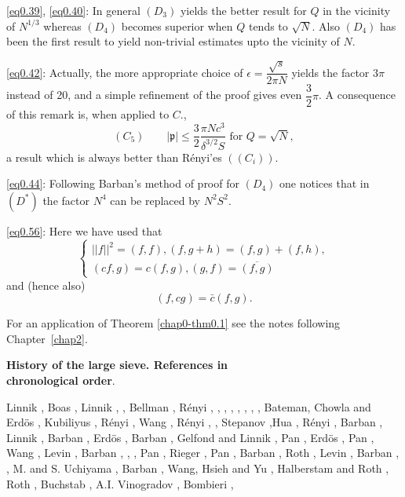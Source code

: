 \eqref{eq0.39}, \eqref{eq0.40}: In general $(D_3)$ yields the better
result for $Q$ in the vicinity of $N^{1/3}$ whereas $(D_4)$ becomes
superior when $Q$ tends to $\sqrt{N}$. Also $(D_4)$ has been the first
result to yield non-trivial estimates upto the vicinity of $N$. 
  
\eqref{eq0.42}: Actually, the more appropriate choice of
$\epsilon=\dfrac{\sqrt{s}}{2\pi N}$ yields the factor $3\pi$ instead of
20, and a simple refinement of the proof gives even
$\dfrac{3}{2}\pi$. A consequence of this remark is, when applied to
$C$.,
\begin{equation*}
(C_{5})\qquad |\mathfrak{p}|\leq \frac{3}{2}\frac{\pi
    Nc^3}{\delta^{3/2}S} \text{ for } Q=\sqrt{N},\tag{0.60}\label{eq0.60}
\end{equation*}
a result which is always better than R\'enyi'es $((C_i))$.
 
\eqref{eq0.44}: Following Barban's method of proof for $(D_4)$ one
notices that in $(D^*)$ the factor $N^4$ can be replaced by $N^2S^2$. 

\eqref{eq0.56}: Here we have used that 
\begin{equation*}
\begin{cases}
||f||^2=(f,f),(f,g+h)=(f,g)+(f,h),\\
(cf,g)=c(f,g),(g,f)=\overline{(f,g)}
\end{cases}\tag{0.61}\label{eq0.61}
\end{equation*}
and (hence also)
\begin{equation*}
(f,cg)=\bar{c}(f,g). \tag{0.62}\label{eq0.62}
\end{equation*}

For an application of Theorem \ref{chap0-thm0.1} see the notes
following Chapter~\ref{chap2}.  

\begin{center}
{\bf{History of the large sieve. References in\\ chronological order}}.
\end{center}

Linnik \cite{key1}, Boas \cite{key1}, Linnik \cite{key2}, \cite{key3},
Bellman \cite{key1},  R\'{e}nyi \cite{key1}, \cite{key2},
\cite{key3}, \cite{key4}, \cite{key5}, \cite{key6}, \cite{key7},
\cite{key8}, Bateman, Chowla and  Erd\"os \cite{key1}, Kubiliyus
\cite{key1}, R\'{e}nyi \cite{key9}, Wang \cite{key1}, R\'{e}nyi
\cite{key10}, \cite{key11},  Stepanov \cite{key1},\pageoriginale Hua
\cite{key1}, R\'{e}nyi \cite{key12}, Barban \cite{key1}, Linnik
\cite{key4}, Barban \cite{key2}, Erd\"{o}s \cite{key1}, Barban
\cite{key3}, Gelfond and Linnik \cite{key1}, Pan \cite{key1},
Erd\"{o}s \cite{key2}, Pan \cite{key2}, Wang \cite{key2}, Levin
\cite{key1}, Barban \cite{key4}, \cite{key5}, \cite{key6}, Pan
\cite{key3}, Rieger \cite{key3}, Pan \cite{key4}, Barban \cite{key7},
Roth \cite{key1}, Levin \cite{key2}, Barban \cite{key8}, \cite{key9},
M. and S. Uchiyama \cite{key1}, Barban \cite{key10}, Wang, Hsieh and
Yu \cite{key1},  Halberstam and Roth \cite{key1}, Roth \cite{key2},
Buchstab \cite{key1}, A.I. Vinogradov \cite{key1}, Bombieri
\cite{key1}, 

